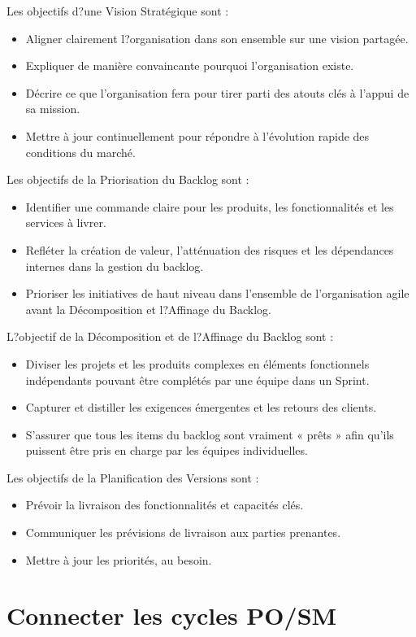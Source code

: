 \documentclass[12pt,a4paper,parskip=full]{scrartcl}
\begin{document}
Les objectifs d?une Vision Stratégique sont :
\begin{itemize}
\item Aligner clairement l?organisation dans son ensemble sur une vision partagée.
\item Expliquer de manière convaincante pourquoi l'organisation existe.
\item Décrire ce que l'organisation fera pour tirer parti des atouts clés à l'appui de sa
mission.
\item Mettre à jour continuellement pour répondre à l'évolution rapide des conditions
du marché.
\end{itemize}
Les objectifs de la Priorisation du Backlog sont :
\begin{itemize}
\item Identifier une commande claire pour les produits, les fonctionnalités et les
services à livrer.
\item Refléter la création de valeur, l'atténuation des risques et les dépendances
internes dans la gestion du backlog.
\item Prioriser les initiatives de haut niveau dans l'ensemble de l'organisation agile
avant la Décomposition et l?Affinage du Backlog.
\end{itemize}
L?objectif de la Décomposition et de l?Affinage du Backlog sont :
\begin{itemize}
\item Diviser les projets et les produits complexes en éléments fonctionnels
indépendants pouvant être complétés par une équipe dans un Sprint.
\item Capturer et distiller les exigences émergentes et les retours des clients.
\item S'assurer que tous les items du backlog sont vraiment « prêts » afin qu'ils
puissent être pris en charge par les équipes individuelles.
\end{itemize}
Les objectifs de la Planification des Versions sont :
\begin{itemize}
\item Prévoir la livraison des fonctionnalités et capacités clés.
\item Communiquer les prévisions de livraison aux parties prenantes.
\item Mettre à jour les priorités, au besoin.
\end{itemize}

\section{Connecter les cycles PO/SM}
\end{document}
